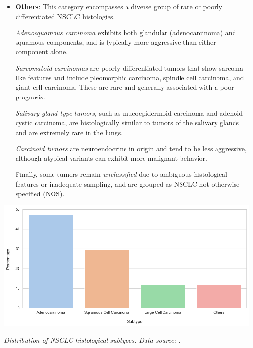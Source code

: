 \begin{itemize}
    \item \textbf{Others}: This category encompasses a diverse group of rare or poorly 
    differentiated NSCLC histologies.
    
    \textit{Adenosquamous carcinoma} exhibits both glandular (adenocarcinoma) and squamous 
    components, and is typically more aggressive than either component alone.
    
    \textit{Sarcomatoid carcinomas} are poorly differentiated tumors that show sarcoma-like features 
    and include pleomorphic carcinoma, spindle cell carcinoma, and giant cell carcinoma. These are 
    rare and generally associated with a poor prognosis.
    
    \textit{Salivary gland-type tumors}, such as mucoepidermoid carcinoma and adenoid cystic 
    carcinoma, are histologically similar to tumors of the salivary glands and are extremely rare in 
    the lungs.
    
    \textit{Carcinoid tumors} are neuroendocrine in origin and tend to be less aggressive, although 
    atypical variants can exhibit more malignant behavior.
    
    Finally, some tumors remain \textit{unclassified} due to ambiguous histological features or 
    inadequate sampling, and are grouped as NSCLC not otherwise specified (NOS). \cite{travis2015}
\end{itemize}

\vspace{1em}
\begin{center}
    \includegraphics[width=1.00\textwidth]{assets/01-overview/nsclc-dist.png}

    \small\textit{Distribution of NSCLC histological subtypes. Data source: \cite{nlm2025}}.
\end{center}
\vspace{1em}

